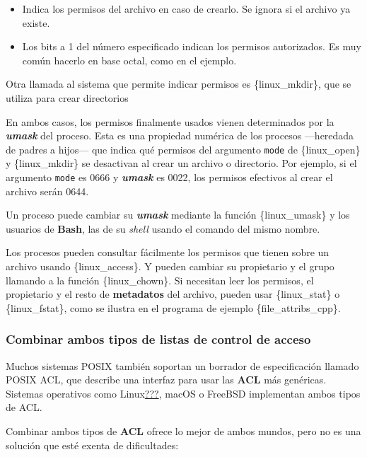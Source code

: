 \begin{itemize}
\item
  Indica los permisos del archivo en caso de crearlo. Se ignora si el
  archivo ya existe.
\item
  Los bits a 1 del número especificado indican los permisos autorizados.
  Es muy común hacerlo en base octal, como en el ejemplo.
\end{itemize}

Otra llamada al sistema que permite indicar permisos es
\{linux\_mkdir\}, que se utiliza para crear directorios

En ambos casos, los permisos finalmente usados vienen determinados por
la \textbf{\emph{{}umask}} del proceso. Esta es una propiedad numérica
de los procesos ---heredada de padres a hijos--- que indica qué permisos
del argumento \texttt{mode} de \{linux\_open\} y \{linux\_mkdir\} se
desactivan al crear un archivo o directorio. Por ejemplo, si el
argumento \texttt{mode} es 0666 y \textbf{\emph{umask}} es 0022, los
permisos efectivos al crear el archivo serán 0644.

Un proceso puede cambiar su \textbf{\emph{umask}} mediante la función
\{linux\_umask\} y los usuarios de \textbf{Bash}, las de su \emph{shell}
usando el comando del mismo nombre.

Los procesos pueden consultar fácilmente los permisos que tienen sobre
un archivo usando \{linux\_access\}. Y pueden cambiar su propietario y
el grupo llamando a la función \{linux\_chown\}. Si necesitan leer los
permisos, el propietario y el resto de \textbf{metadatos} del archivo,
pueden usar \{linux\_stat\} o \{linux\_fstat\}, como se ilustra en el
programa de ejemplo \{file\_attribs\_cpp\}.

\subsubsection{Combinar ambos tipos de listas de control de
acceso}\label{_combinar_ambos_tipos_de_listas_de_control_de_acceso}

Muchos sistemas POSIX también soportan un borrador de especificación
llamado POSIX ACL, que describe una interfaz para usar las \textbf{ACL}
más genéricas. Sistemas operativos como
Linux\hyperref[LinuxManual-acl]{???}, macOS o FreeBSD implementan ambos
tipos de ACL.

Combinar ambos tipos de \textbf{ACL} ofrece lo mejor de ambos mundos,
pero no es una solución que esté exenta de dificultades:

